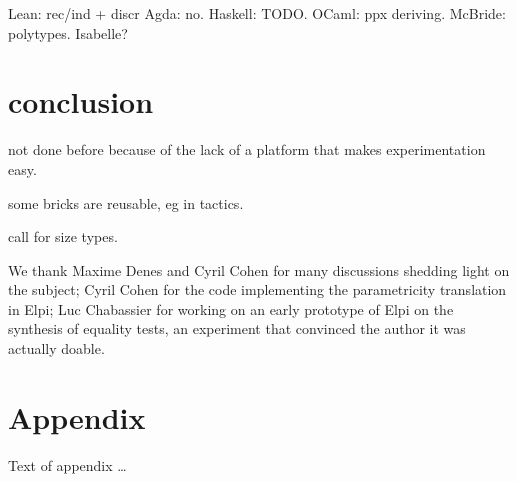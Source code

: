 \documentclass[sigplan,10pt,review]{acmart}\settopmatter{printfolios=true,printccs=false,printacmref=false}
\begin{document}
Lean: rec/ind + discr
Agda: no.
Haskell: TODO.
OCaml: ppx deriving.
McBride: polytypes. Isabelle?

\section{conclusion} %

not done before because of the lack of a platform that makes experimentation
easy.

some bricks are reusable, eg in tactics.

call for size types.

\begin{acks}
We thank Maxime Denes and Cyril Cohen for many discussions shedding light
on the subject; Cyril Cohen for the code implementing the parametricity
translation in Elpi; Luc Chabassier for working on an early prototype of
Elpi on the synthesis of equality tests, an experiment that convinced
the author it was actually doable.
\end{acks}





\appendix
\section{Appendix}

Text of appendix \ldots
\end{document}
